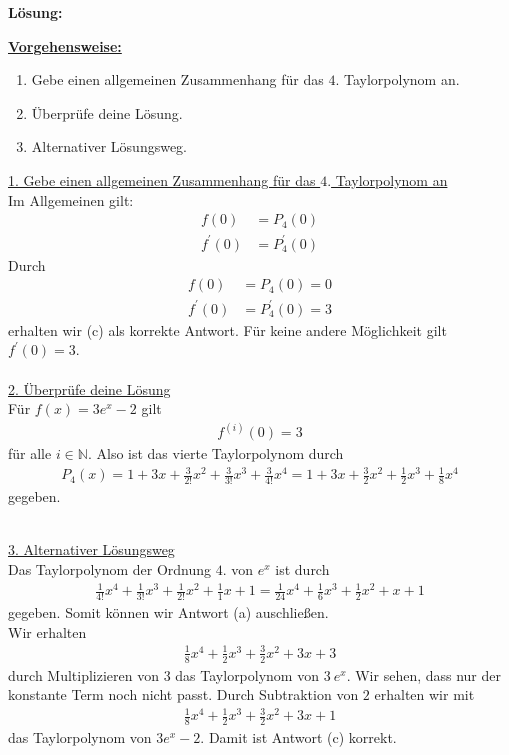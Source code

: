 \textbf{Lösung:}
\begin{mdframed}
\underline{\textbf{Vorgehensweise:}}
\renewcommand{\labelenumi}{\theenumi.}
\begin{enumerate}
\item Gebe einen allgemeinen Zusammenhang für das $4.$ Taylorpolynom an.
\item Überprüfe deine Lösung.
\item Alternativer Lösungsweg.
\end{enumerate}
\end{mdframed}

\underline{1. Gebe einen allgemeinen Zusammenhang für das $4.$ Taylorpolynom an }\\
Im Allgemeinen gilt:
\begin{align*}
f(0) &= P_4(0)\\
f^\prime(0) &= P_4^\prime(0) 
\end{align*}
Durch
\begin{align*}
f(0) &= P_4(0) = 0\\
f^\prime(0) &= P_4^\prime(0) =3 
\end{align*}
erhalten wir (c) als korrekte Antwort.
Für keine andere Möglichkeit gilt $f^\prime(0) = 3$.
\\
\\
\underline{2. Überprüfe deine Lösung}\\
Für $f(x) = 3e^x -2$ gilt
\begin{align*}
f^{(i)}(0) = 3
\end{align*}
für alle $i \in \mathbb{N}$.
Also ist das vierte Taylorpolynom durch
\begin{align*}
P_4(x) = 1  + 3x + \frac{3}{2!} x^2 + \frac{3}{3!} x^3 + \frac{3}{4!} x^4
= 1 + 3x + \frac{3}{2} x^2 + \frac{1}{2} x^3 + \frac{1}{8} x^4
\end{align*}
gegeben.
\\
\\
\newpage

\underline{3. Alternativer Lösungsweg}\\
Das Taylorpolynom der Ordnung $4.$ von $e^x$ ist durch
\begin{align*}
\frac{1}{4!} x^4 + \frac{1}{3!} x^3 + \frac{1}{2!} x^2  + \frac{1}{1} x +1
= 
\frac{1}{24} x^4 + \frac{1}{6} x^3 + \frac{1}{2} x^2 +x +1
\end{align*}
gegeben. Somit können wir Antwort (a) auschließen.\\
Wir erhalten 
\begin{align*}
\frac{1}{8} x^4  + \frac{1}{2} x^3 + \frac{3}{2} x^2 + 3 x + 3
\end{align*}
durch Multiplizieren von $3$ das Taylorpolynom von $3 \ e^x$.
Wir sehen, dass nur der konstante Term noch nicht passt.
Durch Subtraktion von $2$ erhalten wir mit
\begin{align*}
\frac{1}{8} x^4  + \frac{1}{2} x^3 + \frac{3}{2} x^2 + 3 x + 1
\end{align*}
das Taylorpolynom von $3  e^x - 2$.
Damit ist Antwort (c) korrekt.



